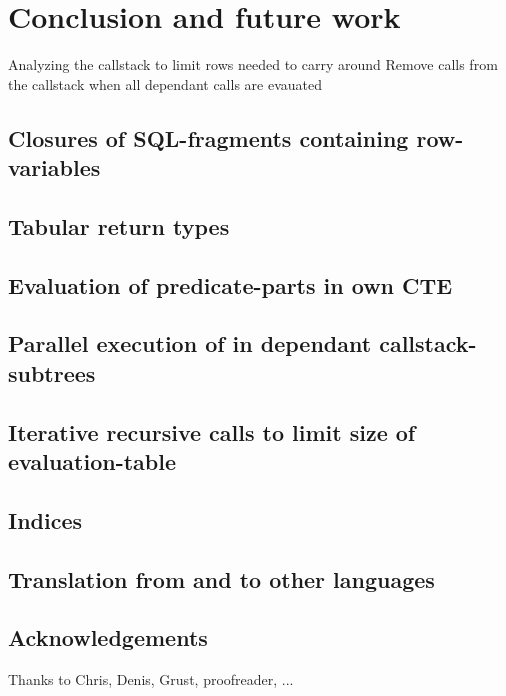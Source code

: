 \chapter{Conclusion and future work} \label{conclusion}
Analyzing the callstack to limit rows needed to carry around
Remove calls from the callstack when all dependant calls are evauated
\section{Closures of SQL-fragments containing row-variables}
\section{Tabular return types}
\section{Evaluation of predicate-parts in own CTE}
\section{Parallel execution of in dependant callstack-subtrees}
\section{Iterative recursive calls to limit size of evaluation-table}
\section{Indices}
\section{Translation from and to other languages}
\section*{Acknowledgements}
Thanks to Chris, Denis, Grust, proofreader, ...